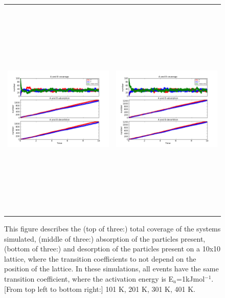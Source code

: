 \documentclass[11pt]{article}
\begin{document}
\begin{figure}[h!]
\begin{tabular}{cc}
\includegraphics[width=3.5in, height=4.2in]{./coadsorb/AtoBcoadsorb10x10_301_allsameksmall__A5_EA1E3_1.png} &
\includegraphics[width=3.5in, height=4.2in]{./coadsorb/AtoBcoadsorb10x10_401_allsameksmall__A5_EA1E3_1.png} 
\end{tabular}
\caption{This figure describes the (top of three:) total coverage of the systems simulated, (middle of three:) absorption of the particles present, (bottom of three:) and desorption of the particles present on a 10x10 lattice, where the transition coefficients to not depend on the position of the lattice. In these simulations, all events have the same transition coefficient, where the activation energy is E$_a$=1kJmol$^{-1}$. [From top left to bottom right:] 101 K, 201 K, 301 K, 401 K. }
\end{figure}
\end{document}

